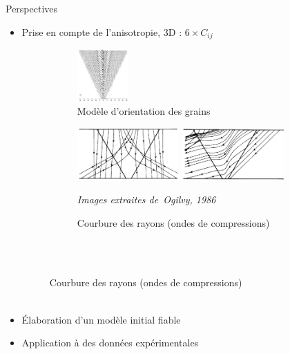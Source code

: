 \begin{frame}{Perspectives}
\setlength{\leftmargin}{-1cm}
\setlength{\rightmargin}{-1cm}

	\begin{itemize}

		\item<1-> Prise en compte de l'anisotropie, 3D : $6 \times C_{ij}$
		\begin{figure}[!h]
		    \centering
		    \hspace{-1cm}\begin{subfigure}[b]{0.25\textwidth}
		    	\centering
		 		\includegraphics[height=2cm]{img/ogilvy_model.png}
		 		\vspace{0.2cm}\caption{\centering \scriptsize Modèle d'orientation des grains}
			\end{subfigure}
			\begin{subfigure}[b]{0.7\textwidth}
				\centering
		 		\includegraphics[height=2cm]{img/ogilvy_ray1.png}
		 		\includegraphics[height=2cm]{img/ogilvy_ray2.png}\\
		 		\raggedright{\vspace{-0.25cm}\tiny{\itshape Images extraites de~Ogilvy, 1986}}
		 		\caption{\scriptsize Courbure des rayons (ondes de compressions) \\~}
			\end{subfigure}\\
				
		\end{figure}	
		\item<2-> Élaboration d'un modèle initial fiable 
		\item<3-> Application à des données expérimentales
	\end{itemize}
	
\end{frame}




